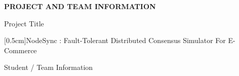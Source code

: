 \documentclass[11pt,a4paper]{article}
\newcommand{\blueheading}[1]{%
    {\sffamily\color{TitleBlue}\fontsize{15}{18}\selectfont #1}%
}
\newcommand{\bluebigheading}[1]{%
    {\sffamily\bfseries\color{TitleBlue}\fontsize{16}{19}\selectfont #1}%
}
\newcommand{\instruction}[1]{%
    {\itshape\fontsize{10.5}{12.5}\selectfont #1}%
}
\newcommand{\answerbox}[2][3.0cm]{%
    \vspace{2pt}
    \noindent
    \fbox{%
        \begin{minipage}[t][#1][t]{\dimexpr\textwidth-2\fboxsep-2\fboxrule\relax}
            \vspace{1mm}
            \itshape #2
        \end{minipage}
    }
}
\begin{document}
\vspace*{4mm}

\bluebigheading{PROJECT AND TEAM INFORMATION}

\vspace{13mm}

\blueheading{Project Title}

\vspace{1mm}

\instruction

\answerbox[0.5cm]{NodeSync : Fault-Tolerant Distributed Consensus Simulator For E-Commerce}

\vspace{13mm}

\blueheading{Student / Team Information}

\vspace{2mm}
\end{document}
